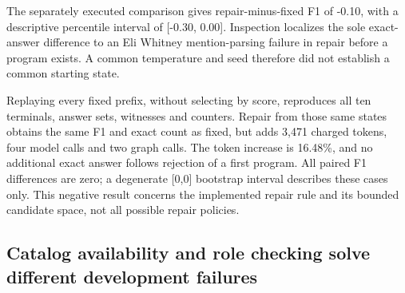 \documentclass[10pt]{article}
\begin{document}
\endgroup

The separately executed comparison gives repair-minus-fixed F1 of -0.10, with a descriptive percentile interval of [-0.30, 0.00]. Inspection localizes the sole exact-answer difference to an Eli Whitney mention-parsing failure in repair before a program exists. A common temperature and seed therefore did not establish a common starting state.\par

Replaying every fixed prefix, without selecting by score, reproduces all ten terminals, answer sets, witnesses and counters. Repair from those same states obtains the same F1 and exact count as fixed, but adds 3,471 charged tokens, four model calls and two graph calls. The token increase is 16.48\%, and no additional exact answer follows rejection of a first program. All paired F1 differences are zero; a degenerate [0,0] bootstrap interval describes these cases only. This negative result concerns the implemented repair rule and its bounded candidate space, not all possible repair policies.\par

\subsection{Catalog availability and role checking solve different development failures}

\begingroup\small\setlength{\tabcolsep}{4pt}
\end{document}
